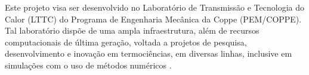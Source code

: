 \bigskip 
Este projeto visa ser desenvolvido no Laboratório de Transmissão e Tecnologia do Calor (LTTC) do Programa de Engenharia Mecânica da Coppe (PEM/COPPE). 
Tal laboratório dispõe de uma ampla infraestrutura, 
além de recursos computacionais de última geração, 
voltada a projetos de pesquisa, desenvolvimento e inovação
em termociências, em diversas linhas, 
inclusive em simulações com o uso de métodos numéricos \cite{lttccoppe}. 


